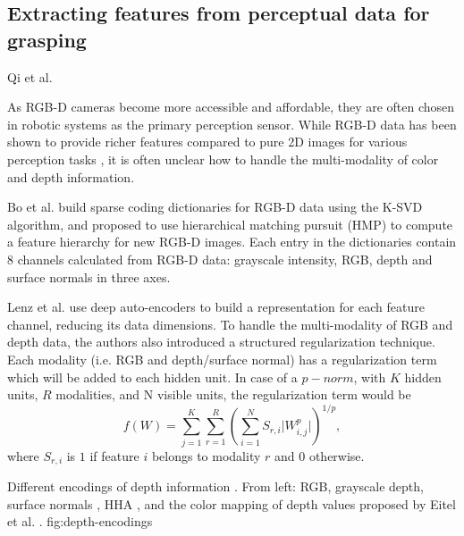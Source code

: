 \subsection{Extracting features from perceptual data for grasping}
Qi et al. \cite{Qi2016}

As RGB-D cameras become more accessible and affordable, they are often chosen in robotic systems as the primary
perception sensor. While RGB-D data has been shown to provide richer features compared to pure 2D images for various
perception tasks \cite{lenz2015,Eitel2015,Gupta2014RGBDFeatures,jiang2011}, it is often unclear how to handle the
multi-modality of color and depth information.

Bo et al. \cite{Bo2013} build sparse coding dictionaries for RGB-D data using the K-SVD algorithm, and proposed to use
hierarchical matching pursuit (HMP) to compute a feature hierarchy for new RGB-D images. Each entry in the dictionaries
contain 8 channels calculated from RGB-D data: grayscale intensity, RGB, depth and surface normals in three axes.

Lenz et al. \cite{lenz2015} use deep auto-encoders to build a representation for each feature channel, reducing its data
dimensions. To handle the multi-modality of RGB and depth data, the authors also introduced a structured regularization
technique. Each modality (i.e. RGB and depth/surface normal) has a regularization term which will be added to each
hidden unit. In case of a $p-norm$, with $K$ hidden units, $R$ modalities, and N visible units, the regularization term
would be
\[f(W) = \sum\limits^K_{j=1} \sum\limits^R_{r=1} \left( \sum\limits^N_{i=1} S_{r,i} \lvert W^p_{i,j} \rvert \right)
^{1/p}, \]
where $S_{r,i}$ is $1$ if feature $i$ belongs to modality $r$ and $0$ otherwise.

{Different encodings of depth information \cite{Eitel2015}. From left: RGB, grayscale depth, surface
    normals \cite{Bo2013}, HHA \cite{Gupta2014RGBDFeatures}, and the color mapping of depth values proposed
    by Eitel et al. \cite{Eitel2015}.}
{fig:depth-encodings}{\linewidth}

